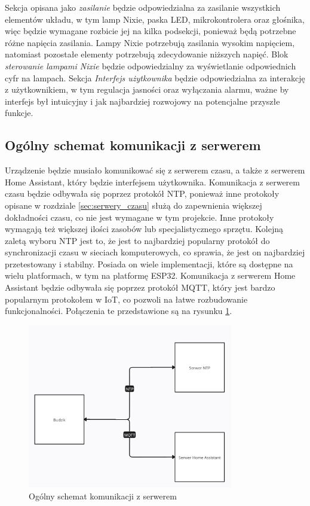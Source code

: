 \documentclass[../main.tex]{subfiles}
\begin{document}
Sekcja opisana jako \textit{zasilanie} będzie odpowiedzialna za zasilanie wszystkich elementów układu, w tym lamp Nixie, paska LED, mikrokontrolera oraz głośnika,
więc będzie wymagane rozbicie jej na kilka podsekcji, ponieważ będą potrzebne różne napięcia zasilania. Lampy Nixie potrzebują zasilania wysokim napięciem,
natomiast pozostałe elementy potrzebują zdecydowanie niższych napięć. Blok \textit{sterowanie lampami Nixie} będzie odpowiedzialny za wyświetlanie odpowiednich cyfr na lampach.
Sekcja \textit{Interfejs użytkownika} będzie odpowiedzialna za interakcję z użytkownikiem, w tym regulacja jasności oraz wyłączania alarmu, ważne by interfejs był 
intuicyjny i jak najbardziej rozwojowy na potencjalne przyszłe funkcje.
\subsection{Ogólny schemat komunikacji z serwerem}
Urządzenie będzie musiało komunikować się z serwerem czasu, a także z serwerem Home Assistant, który będzie interfejsem użytkownika.
Komunikacja z serwerem czasu będzie odbywała się poprzez protokół NTP, ponieważ inne protokoły opisane w rozdziale \ref{sec:serwery_czasu}
służą do zapewnienia większej dokładności czasu, co nie jest wymagane w tym projekcie. Inne protokoły wymagają też większej ilości zasobów lub specjalistycznego sprzętu.
Kolejną zaletą wyboru NTP jest to, że jest to najbardziej popularny protokół do synchronizacji czasu w sieciach komputerowych, co sprawia, że jest on najbardziej przetestowany i stabilny.
Posiada on wiele implementacji, które są dostępne na wielu platformach, w tym na platformę ESP32.
Komunikacja z serwerem Home Assistant będzie odbywała się poprzez protokół MQTT, który jest bardzo popularnym protokołem w IoT, co pozwoli na łatwe rozbudowanie funkcjonalności.
Połączenia te przedstawione są na rysunku \ref{fig:communication}.
\begin{figure}[H]
    \centering
    \includegraphics[width=0.8\textwidth]{polaczenia.png}
    \caption{Ogólny schemat komunikacji z serwerem}
    \label{fig:communication}
\end{figure}
\end{document}
